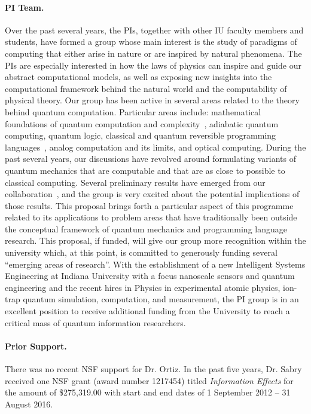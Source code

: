 \documentclass{article}
\theoremstyle{remark}
\begin{document}
\paragraph*{PI Team.} Over the past several years, the PIs, together
with other IU faculty members and students, have formed a group whose
main interest is the study of paradigms of computing that either arise
in nature or are inspired by natural phenomena. The PIs are especially
interested in how the laws of physics can inspire and guide our
abstract computational models, as well as exposing new insights into
the computational framework behind the natural world and the
computability of physical theory. Our group has been active in several
areas related to the theory behind quantum computation. Particular
areas include: mathematical foundations of quantum computation and
complexity~\cite{AGVS2007,VAS2006}, adiabatic quantum computing,
quantum logic, classical and quantum reversible programming
languages~\cite{Sabry:2003:MQC:871895.871900}, analog computation and
its limits, and optical computing. During the past several years, our
discussions have revolved around formulating variants of quantum
mechanics that are computable and that are as close to possible to
classical computing. Several preliminary results have emerged from our
collaboration~\cite{usat,finiteQC,geometry2013,DQT2014}, and the group
is very excited about the potential implications of those
results. This proposal brings forth a particular aspect of this
programme related to its applications to problem areas that have
traditionally been outside the conceptual framework of quantum
mechanics and programming language research. This proposal, if funded,
will give our group more recognition within the university which, at
this point, is committed to generously funding several ``emerging
areas of research''. With the establishment of a new Intelligent
Systems Engineering at Indiana University with a focus nanoscale
sensors and quantum engineering and the recent hires in Physics in
experimental atomic physics, ion-trap quantum simulation, computation,
and measurement, the PI group is in an excellent position to receive
additional funding from the University to reach a critical mass of
quantum information researchers.

\paragraph*{Prior Support.} There was no recent NSF support for
Dr. Ortiz. In the past five years, Dr. Sabry received one NSF grant
(award number 1217454) titled \emph{Information Effects} for the
amount of \$275,319.00 with start and end dates of 1 September 2012 --
31 August 2016.
\end{document}
